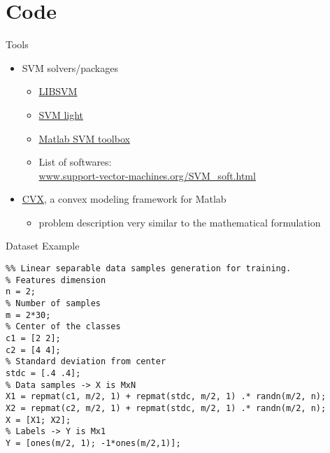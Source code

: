 \documentclass{beamer}
\begin{document}
\section{Code}

\begin{frame}{Tools}
    \begin{itemize}
        \item SVM solvers/packages
            \begin{itemize}
                \item \href{http://www.csie.ntu.edu.tw/~cjlin/libsvm/}{LIBSVM}
                \item \href{http://svmlight.joachims.org/}{SVM light}
                \item \href{http://www.isis.ecs.soton.ac.uk/resources/svminfo/}{Matlab SVM
                    toolbox}
                \item List of softwares:\\
                    \href{http://www.support-vector-machines.org/SVM_soft.html}
                    {www.support-vector-machines.org/SVM\_soft.html}
            \end{itemize}
        \vspace{.5cm}
        \item \href{http://cvxr.com/cvx/}{\alert{CVX}}, a convex modeling framework for Matlab
            \begin{itemize}
                \item problem description very similar to the mathematical formulation
            \end{itemize}
    \end{itemize}
\end{frame}


\begin{frame}[fragile]{Dataset Example}

    \begin{verbatim}
%% Linear separable data samples generation for training.
% Features dimension
n = 2;
% Number of samples
m = 2*30;
% Center of the classes
c1 = [2 2];
c2 = [4 4];
% Standard deviation from center
stdc = [.4 .4];
% Data samples -> X is MxN
X1 = repmat(c1, m/2, 1) + repmat(stdc, m/2, 1) .* randn(m/2, n);
X2 = repmat(c2, m/2, 1) + repmat(stdc, m/2, 1) .* randn(m/2, n);
X = [X1; X2]; 
% Labels -> Y is Mx1
Y = [ones(m/2, 1); -1*ones(m/2,1)];
    \end{verbatim}
\end{frame}
\end{document}
